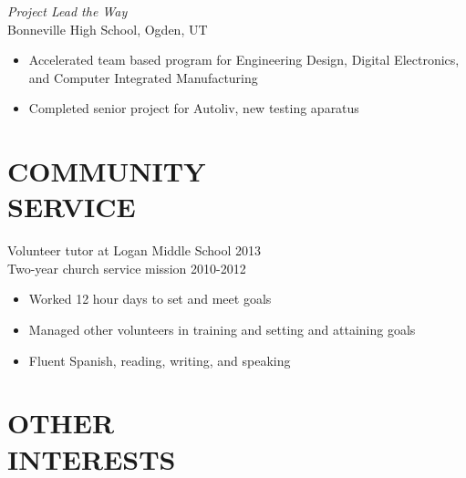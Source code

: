 \documentclass[line,margin]{res}
\begin{document}
\begin{resume}
   {\sl Project Lead the Way}\\
   Bonneville High School, Ogden, UT
   \begin{itemize} \itemsep -2pt
	   \item Accelerated team based program for Engineering Design, Digital Electronics,
			 and Computer Integrated Manufacturing
	   \item Completed senior project for Autoliv, new testing aparatus
   \end{itemize}

	\section{COMMUNITY \\ SERVICE}


	Volunteer tutor at Logan Middle School \hfill 2013
	\\Two-year church service mission \hfill 2010-2012
	\begin{itemize} \itemsep -2pt %
		\item Worked 12 hour days to set and meet goals
		\item Managed other volunteers in training and setting and attaining goals
		\item Fluent Spanish, reading, writing, and speaking
	\end{itemize}

	\section{OTHER \\ INTERESTS}




\end{resume}
\end{document}
